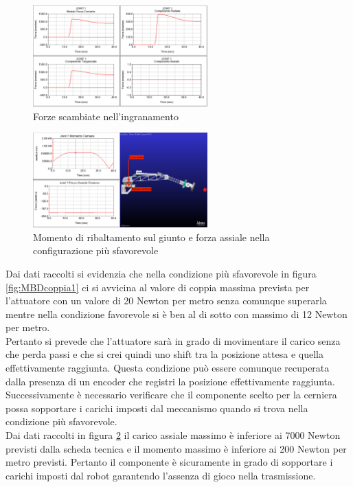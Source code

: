 \documentclass[%
corpo=11pt,
twoside,
 stile=classica,
oldstyle,
greek,%
]{toptesi}
\begin{document}
	\begin{figure} [!ht]
		\centering
		\includegraphics[width=0.6\textwidth]{Plots/BASE/joint1_forze.png}
		\caption{Forze scambiate nell'ingranamento}
		\label{fig:MBDforze1}
	\end{figure}
	\begin{figure}[!ht]
		\centering
		\includegraphics[width=0.6\textwidth]{Plots/BASE/joint1_ralla.png}
		\caption{Momento di ribaltamento sul giunto e forza assiale nella configurazione più sfavorevole}
		\label{fig:MBDralla1}
	\end{figure}
	
			Dai dati raccolti si evidenzia che nella condizione più sfavorevole in figura \ref{fig:MBDcoppia1}  ci si avvicina al valore di coppia massima prevista per l'attuatore con un valore di 20 Newton per metro senza comunque superarla mentre nella condizione favorevole si è ben al di sotto con massimo di 12 Newton per metro. \\
			Pertanto si prevede che l'attuatore sarà in grado di movimentare il carico senza che perda passi e che si crei quindi uno shift tra la posizione attesa e quella effettivamente raggiunta. Questa condizione può essere comunque recuperata dalla presenza di un encoder che registri la posizione effettivamente raggiunta. \\
			
			Successivamente è necessario verificare che il componente scelto per la cerniera possa sopportare i carichi imposti dal meccanismo quando si trova nella condizione più sfavorevole.\\
			Dai dati raccolti in figura \ref{fig:MBDralla1} il carico assiale massimo è inferiore ai 7000 Newton previsti dalla scheda tecnica e il momento massimo è inferiore ai 200 Newton per metro previsti. Pertanto il componente è sicuramente in grado di sopportare i carichi imposti dal robot garantendo l'assenza di gioco nella trasmissione. \\
			
\end{document}

